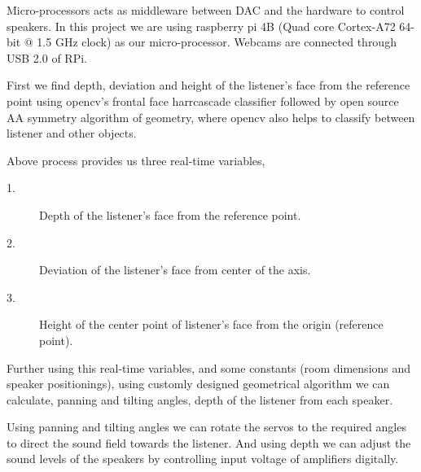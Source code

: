 \documentclass[../block_diagram_intro/block_diagram_intro.tex]{subfiles}
\begin{document}
Micro-processors acts as middleware between DAC and the hardware to control speakers.
In this project we are using raspberry pi 4B (Quad core Cortex-A72 64-bit @ 1.5 GHz clock) 
as our micro-processor. Webcams are connected through USB 2.0 of RPi.

First we find depth, deviation and height of the listener's face from the reference point
using opencv's frontal face harrcascade classifier followed by open source AA symmetry 
algorithm of geometry, where opencv also helps to classify between listener and other objects. 

Above process provides us three real-time variables,

\begin{description}
    \item[1.]Depth of the listener's face from the reference point.
    \item[2.]Deviation of the listener's face from center of the axis.
    \item[3.]Height of the center point of listener's face from the origin (reference point).  
\end{description}

Further using this real-time variables, and some constants (room dimensions and speaker positionings),
using customly designed geometrical algorithm we can calculate, panning and tilting angles, depth of 
the listener from each speaker.

Using panning and tilting angles we can rotate the servos to the required angles to direct the sound field
towards the listener. And using depth we can adjust the sound levels of the speakers by controlling
input voltage of amplifiers digitally.
\end{document}
